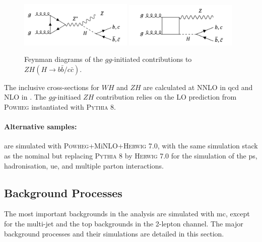 \begin{figure}[h!]
  \center
  \includegraphics[width=0.48\textwidth]{Images/VH/Feynman/vh2order.png}
  \includegraphics[width=0.48\textwidth]{Images/VH/Feynman/vh3order.png}
  \caption{Feynman diagrams of the $gg$-initiated contributions to $ZH(H\rightarrow b\bar{b}/c\bar{c})$.} 
  \label{fig:feynnloVH}
\end{figure}

The inclusive cross-sections for $WH$ and $ZH$ are calculated at NNLO in \gls{qcd} \cite{BREIN2004149} and NLO in  \cite{PDFLHCrun2}. The $gg$-initiaed $ZH$ contribution relies on the LO prediction from \textsc{Powheg} instantiated with \textsc{Pythia} 8.

\paragraph{Alternative samples:} are simulated with \textsc{Powheg}+MiNLO+\textsc{Herwig} 7.0, with the same simulation stack as the nominal but replacing \textsc{Pythia} 8 by \textsc{Herwig} 7.0 \cite{bellm2017herwig} for the simulation of the \gls{ps}, hadronisation, \gls{ue}, and multiple parton interactions.

\subsection{Background Processes}
The most important backgrounds in the analysis are simulated with \gls{mc}, except for the multi-jet and the top backgrounds in the 2-lepton channel. The major background processes and their simulations are detailed in this section.

